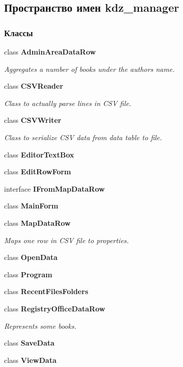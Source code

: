 \subsection{Пространство имен kdz\+\_\+manager}
\label{namespacekdz__manager}
\subsubsection*{Классы}
\begin{DoxyCompactItemize}
\item 
class {\bf Admin\+Area\+Data\+Row}
\begin{DoxyCompactList}\small\item\em Aggregates a number of books under the author\textquotesingle{}s name. \end{DoxyCompactList}\item 
class {\bf C\+S\+V\+Reader}
\begin{DoxyCompactList}\small\item\em Class to actually parse lines in C\+S\+V file. \end{DoxyCompactList}\item 
class {\bf C\+S\+V\+Writer}
\begin{DoxyCompactList}\small\item\em Class to serialize C\+S\+V data from data table to file. \end{DoxyCompactList}\item 
class {\bf Editor\+Text\+Box}
\item 
class {\bf Edit\+Row\+Form}
\item 
interface {\bf I\+From\+Map\+Data\+Row}
\item 
class {\bf Main\+Form}
\item 
class {\bf Map\+Data\+Row}
\begin{DoxyCompactList}\small\item\em Maps one row in C\+S\+V file to properties. \end{DoxyCompactList}\item 
class {\bf Open\+Data}
\item 
class {\bf Program}
\item 
class {\bf Recent\+Files\+Folders}
\item 
class {\bf Registry\+Office\+Data\+Row}
\begin{DoxyCompactList}\small\item\em Represents some books. \end{DoxyCompactList}\item 
class {\bf Save\+Data}
\item 
class {\bf View\+Data}
\end{DoxyCompactItemize}
